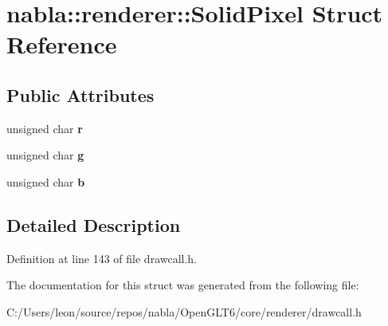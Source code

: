 \hypertarget{structnabla_1_1renderer_1_1_solid_pixel}{}\section{nabla\+::renderer\+::Solid\+Pixel Struct Reference}
\label{structnabla_1_1renderer_1_1_solid_pixel}
\subsection*{Public Attributes}
\begin{DoxyCompactItemize}
\item 
\mbox{\label{structnabla_1_1renderer_1_1_solid_pixel_a060b36a1d658f15084866d6841168736}} 
unsigned char {\bfseries r}
\item 
\mbox{\label{structnabla_1_1renderer_1_1_solid_pixel_a087af4908ce01093a5760b6050712294}} 
unsigned char {\bfseries g}
\item 
\mbox{\label{structnabla_1_1renderer_1_1_solid_pixel_a5646fe8ff09bcec54d836808127531df}} 
unsigned char {\bfseries b}
\end{DoxyCompactItemize}


\subsection{Detailed Description}


Definition at line 143 of file drawcall.\+h.



The documentation for this struct was generated from the following file\+:\begin{DoxyCompactItemize}
\item 
C\+:/\+Users/leon/source/repos/nabla/\+Open\+G\+L\+T6/core/renderer/drawcall.\+h\end{DoxyCompactItemize}
